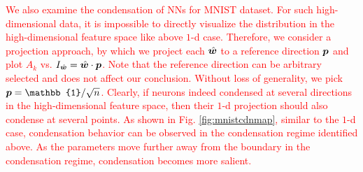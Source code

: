 \documentclass[twoside,11pt]{article}
\begin{document}
\textcolor{red}{We also examine the condensation of NNs for MNIST dataset. For such high-dimensional data, it is impossible to directly visualize the distribution in the high-dimensional feature space like above $1$-d case. Therefore, we consider a projection approach, by which we project each $\hat{\bm{w}}$ to a reference direction $\bm{p}$ and plot $A_k$ vs. $I_{\hat{\bm{w}}}=\hat{\bm{w}}\cdot \bm{p}$. Note that the reference direction can be arbitrary selected and does not affect our conclusion. Without loss of generality, we pick $\vp=\mathbb{1}/\sqrt{n}$. Clearly, if neurons indeed condensed at several directions in the high-dimensional feature space, then their $1$-d projection should also condense at several points. As shown in  Fig. \ref{fig:mnistcdnmap}, similar to the $1$-d case, 
condensation behavior can be observed in the condensation regime identified above. As the parameters move further away from the boundary in the condensation regime, condensation becomes more salient.}
\end{document}
